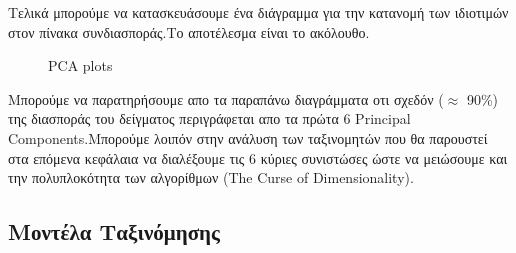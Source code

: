 \documentclass[12pt,a4paper]{article}
\begin{document}
Τελικά μπορούμε να κατασκευάσουμε ένα διάγραμμα για την κατανομή των ιδιοτιμών στον πίνακα συνδιασποράς.Το αποτέλεσμα είναι το ακόλουθο.
\begin{figure}[H]
    \centering
    \qquad
    \caption{PCA plots}%
    \label{fig:example}%
\end{figure}
Μπορούμε να παρατηρήσουμε απο τα παραπάνω διαγράμματα οτι σχεδόν ($\approx$ 90\%) της διασποράς του δείγματος περιγράφεται απο τα πρώτα 6 Principal Components.Μπορούμε λοιπόν στην ανάλυση των ταξινομητών που θα παρουστεί στα επόμενα κεφάλαια να διαλέξουμε τις 6 κύριες συνιστώσες ώστε να μειώσουμε και την πολυπλοκότητα των αλγορίθμων (The Curse of Dimensionality).
\newpage
\subsection{Μοντέλα Ταξινόμησης}
\end{document}
